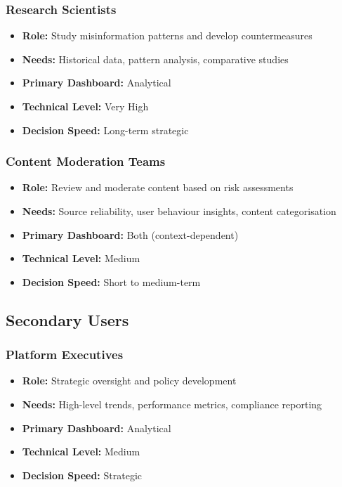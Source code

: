 \documentclass[11pt,a4paper]{article}
\begin{document}
\subsubsection{Research Scientists}
\begin{itemize}
    \item \textbf{Role:} Study misinformation patterns and develop countermeasures
    \item \textbf{Needs:} Historical data, pattern analysis, comparative studies
    \item \textbf{Primary Dashboard:} Analytical
    \item \textbf{Technical Level:} Very High
    \item \textbf{Decision Speed:} Long-term strategic
\end{itemize}

\subsubsection{Content Moderation Teams}
\begin{itemize}
    \item \textbf{Role:} Review and moderate content based on risk assessments
    \item \textbf{Needs:} Source reliability, user behaviour insights, content categorisation
    \item \textbf{Primary Dashboard:} Both (context-dependent)
    \item \textbf{Technical Level:} Medium
    \item \textbf{Decision Speed:} Short to medium-term
\end{itemize}

\subsection{Secondary Users}

\subsubsection{Platform Executives}
\begin{itemize}
    \item \textbf{Role:} Strategic oversight and policy development
    \item \textbf{Needs:} High-level trends, performance metrics, compliance reporting
    \item \textbf{Primary Dashboard:} Analytical
    \item \textbf{Technical Level:} Medium
    \item \textbf{Decision Speed:} Strategic
\end{itemize}
\end{document}
